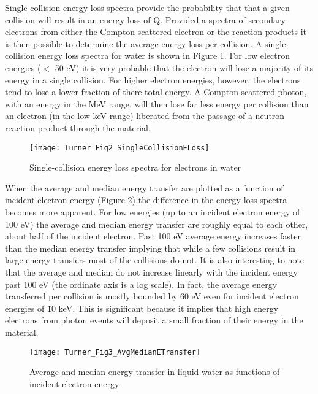 Single collision energy loss spectra provide the probability that that a given collision will result in an energy loss of Q.
Provided a spectra of secondary electrons from either the Compton scattered electron or the  reaction products it is then possible to determine the average energy loss per collision.
A single collision energy loss spectra for water is shown in Figure \ref{fig:TurnerELoss}.
For low electron energies ($<$ 50 eV) it is very probable that the electron will lose a majority of its energy in a single collision.
For higher electron energies, however, the electrons tend to lose a lower fraction of there total energy. 
A Compton scattered photon, with an energy in the MeV range, will then lose far less energy per collision than an electron (in the low keV range) liberated from the passage of a neutron reaction product through the material.
\begin{figure}[ht]
    \centering
    \texttt{[image: Turner\_Fig2\_SingleCollisionELoss]}
    \caption{Single-collision energy loss spectra for electrons in water \protect\cite{turner_comparative_1982}}
    \label{fig:TurnerELoss}
\end{figure}
When the average and median energy transfer are plotted as a function of incident electron energy (Figure \ref{fig:TurnerETransfer}) the difference in the energy loss spectra becomes more apparent.
For low energies (up to an incident electron energy of 100 eV) the average and median energy transfer are roughly equal to each other, about half of the incident electron.
Past 100 eV average energy increases faster than the median energy transfer implying that while a few collisions result in large energy transfers most of the collisions do not.
It is also interesting to note that the average and median do not increase linearly with the incident energy past 100 eV (the ordinate axis is a log scale). 
In fact, the average energy transferred per collision is mostly bounded by 60 eV even for incident electron energies of \~10 keV.
This is significant because it implies that high energy electrons from photon events will deposit a small fraction of their energy in the material.
\begin{figure}[ht]
    \centering
    \texttt{[image: Turner\_Fig3\_AvgMedianETransfer]}
    \caption{Average and median energy transfer in liquid water as functions of incident-electron energy \protect\cite{turner_comparative_1982}}
    \label{fig:TurnerETransfer}
\end{figure}
